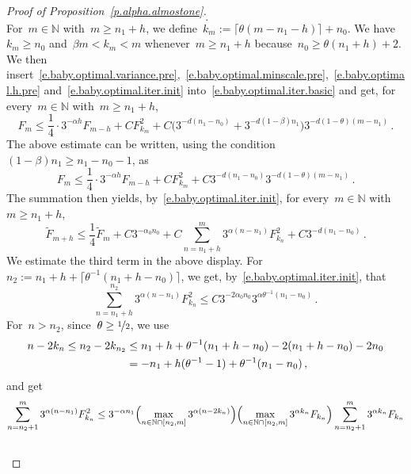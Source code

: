 \documentclass[11pt,twoside]{article} %
\numberwithin{equation}{section}
\theoremstyle{definition}
\newcommand*{\N}{\ensuremath{\mathbb{N}}}
\renewcommand*{\tilde}{\widetilde}
\begin{document}
\begin{proof}[{Proof of Proposition~\ref{p.alpha.almostone}}]
\begin{equation*}
 \,.
\end{equation*}
For~$m\in \N$ with~$m\geq n_1+h$, we define~$k_m := \lceil \theta (m -n_1-h) \rceil + n_0$. We have~$k_m \geq n_0$ and~$\beta m < k_m < m$ whenever~$m\geq n_1+h$ because~$n_0 \geq \theta(n_1+h)+2$. We then insert~\eqref{e.baby.optimal.variance.pre},~\eqref{e.baby.optimal.minscale.pre},~\eqref{e.baby.optimal.h.pre} and~\eqref{e.baby.optimal.iter.init} into~\eqref{e.baby.optimal.iter.basic} and get, for every~$m \in \N$ with~$m\geq n_1 + h$, 
\begin{equation*} 
F_m 
\leq 
\frac14 \cdot 3^{-\alpha h} F_{m-h}
+ C F_{k_m}^2 +  C \bigl( 3^{-d(n_1-n_0)} + 3^{-d(1-\beta) n_1}\bigr)3^{-d(1-\theta)(m-n_1)}
\,.
\end{equation*}
The above estimate can be written, using the condition~$(1-\beta)n_1 \geq n_1 - n_0 -1$, as
\begin{equation*} 
F_m 
\leq 
\frac14 \cdot 3^{-\alpha h} F_{m-h}
+ C F_{k_m}^2 +  C 3^{-d(n_1- n_0) } 3^{-d(1-\theta)(m-n_1)}\,.
\end{equation*}
The summation then yields, by~\eqref{e.baby.optimal.iter.init}, for every~$m\in\N$ with~$m \geq n_1 + h$, 
\begin{equation*} 
\tilde{F}_{m+h} 
\leq
\frac14 \tilde{F}_{m} + C 3^{-\alpha_0 n_0}
+C\sum_{n=n_1+h}^m 3^{\alpha (n-n_1)} F_{k_n}^2
+ C 3^{-d(n_1- n_0) }\,.
\end{equation*}
We estimate the third term in the above display. For~$n_2:= n_1+h + \lceil \theta^{-1} (n_1 + h - n_0) \rceil $, we get, by~\eqref{e.baby.optimal.iter.init}, that
\begin{equation*} 
\sum_{n=n_1+h}^{n_2} 3^{\alpha (n-n_1)} F_{k_n}^2
\leq C 3^{-2\alpha_0 n_0} 3^{\alpha \theta^{-1} (n_1-n_0)}
\,.
\end{equation*}
For~$n > n_2$, since~$\theta \geq \nicefrac12$, we use
\begin{align*} 
n - 2k_n 
\leq n_2 -2k_{n_2}  
& \leq n_1 + h + \theta^{-1}(n_1 + h - n_0)  - 2(n_1+h-n_0) -2n_0
\notag \\ &
= - n_1 + h(\theta^{-1}-1) + \theta^{-1}(n_1  - n_0)  \,, 
\end{align*}
and get
\begin{align*} 
\sum_{n=n_2+1}^m 3^{\alpha (n-n_1)} F_{k_n}^2 
&
\leq
3^{-\alpha n_1}\Bigl( \max_{n \in \N \cap [n_2,m]} 3^{\alpha( n -2 k_n)}\Bigr)
\Bigl( \max_{n \in \N \cap [n_2,m] } 
3^{\alpha k_n} F_{k_n} \Bigr)
\sum_{n=n_2+1}^m 3^{\alpha k_n} F_{k_n}
\notag \\ & 

\end{align*}
\end{proof}
\end{document}
